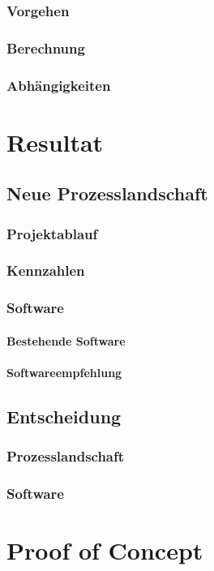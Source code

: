 \documentclass[
11pt, %
a4paper, %
BCOR25mm, %
DIV14, %
footsepline = false, %
headsepline, %
twoside, %
openright,
abstracton, %
listof=totocnumbered, %
bibliography=totocnumbered %
]{scrreprt}
\begin{document}
  \subsection{Vorgehen}
  \subsection{Berechnung}
  \subsection{Abhängigkeiten}
  
  \chapter{Resultat}
  \section{Neue Prozesslandschaft}
  \subsection{Projektablauf}
  \subsection{Kennzahlen}
  \subsection{Software}
  \subsubsection{Bestehende Software}
  \subsubsection{Softwareempfehlung}
  \section{Entscheidung}
  \subsection{Prozesslandschaft}
  \subsection{Software}
  
  \chapter{Proof of Concept}
\end{document}
